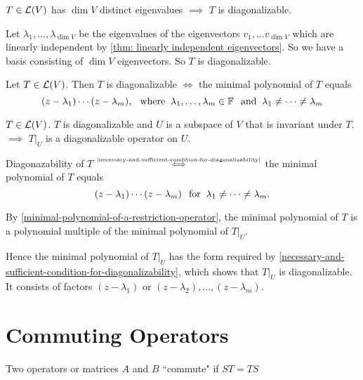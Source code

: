 \setcounter{thm}{57}
\begin{thm} 
  \label{thm: enough eigenvalues implies diagonalizability}
  $T\in \mathcal{L}(V)$ has $\dim V$ distinct eigenvalues $\implies$ $T$ is diagonalizable.
\end{thm}
\begin{prf}
  Let $\lambda_1, \ldots, \lambda_{\dim V}$ be the eigenvalues of the eigenvectors $v_1, \ldots v_{\dim V}$ which are linearly independent by \autoref{thm: linearly independent eigenvectors}. So we have a basis consisting of $\dim V$ eigenvectors. So $T$ is diagonalizable.
\end{prf}

\setcounter{thm}{61}
\begin{thm}
  \label{thm: necessary and sufficient condition for diagonalizability}
  Let $T\in \mathcal{L} (V)$\footnotemark[1]. Then $T$ is diagonalizable $\iff$ the minimal polynomial of $T$ equals
  \begin{equation}
    (z-\lambda_1) \cdots (z-\lambda_m), \;\;\, \text{where}\;\; \lambda_1, \dots, \lambda_m \in \mathbb{F} \;\;\, \text{and}\;\; \lambda_1 \neq \cdots \neq \lambda_m
  \end{equation}
\end{thm}

\setcounter{thm}{64}
\begin{thm}
  \label{thm: restriction of diagonalizable operator to invariant subspace}
  $T\in \mathcal{L}(V)$. $T$ is diagonalizable and $U$ is a subspace of $V$ that is invariant under $T$. \\
  $\implies$ $\left.T\right|_U$ is a diagonalizable operator on $U$.
\end{thm}
\begin{prf}
  Diagonazability of $T$ $\mathsmaller{\overset{\text{\ref{necessary-and-sufficient-condition-for-diagonalizability}}}{\iff}}$ the minimal polynomial of $T$ equals 
  \begin{equation}
    (z-\lambda_1)\cdots(z-\lambda_m) \;\;\, \text{for}\;\; \lambda_1 \neq \cdots \neq \lambda_m.
  \end{equation} 
  
  By \ref{minimal-polynomial-of-a-restriction-operator}, the minimal polynomial of $T$ is a polynomial multiple of the minimal polynomial of $\left.T\right|_U$.
  
  Hence the minimal polynomial of $\left.T\right|_U$  has the form required by \ref{necessary-and-sufficient-condition-for-diagonalizability}, which shows that $\left.T\right|_U$ is diagonalizable. It consists of factors $(z-\lambda_1)$ or $(z-\lambda_2), \dots, (z-\lambda_m)$.
\end{prf}


\section{Commuting Operators}
\begin{mydef}
  Two operators or matrices $A$ and $B$ ``commute" if $ST=TS$
\end{mydef}